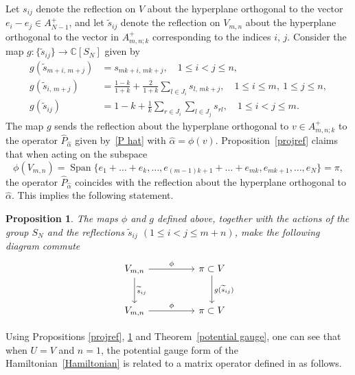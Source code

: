 \documentclass[12pt]{amsart}
\newcommand{\C}{\mathbb C}
\DeclareMathOperator{\Span}{Span}
\numberwithin{equation}{section}
\newtheorem{prop}[theorem]{Proposition}
\theoremstyle{definition}
\begin{document}
Let $s_{ij}$ denote the reflection on $V$ about the hyperplane orthogonal to the vector $e_i - e_j \in A_{N-1}^+$, and let $\widetilde{s}_{ij}$ denote the reflection on $V_{m,n}$ about the hyperplane orthogonal to the vector
in $A_{m,n; k}^+$ corresponding to the indices $i$, $j$. 
Consider the map $g \colon \{ \widetilde{s}_{ij} \} \to \C[S_N]$ given by
\begin{align*}
    g(\widetilde{s}_{m+i, \, m+j}) &= s_{mk+i, \, mk+j}, \quad 1 \leq i < j \leq n, 
    \\
    g(\widetilde{s}_{i, \, m+j}) &= \frac{1-k}{1+k} + \frac{2}{1+k} \sum\limits_{l \in J_{i}} s_{l, \, mk+j}, \quad 
    1 \leq i \leq m, \ 1 \leq j \leq n,
    \\
    g(\widetilde{s}_{ij}) &= 1-k+\frac{1}{k} \sum\limits_{r \in J_{i}} \sum\limits_{l \in J_{j}} s_{rl}, \quad 1 \leq i < j \leq m.
\end{align*}
The map $g$ sends the reflection about the hyperplane orthogonal to $v \in A_{m,n; k}^+$ to the operator  $\widehat{P}_{\widehat{\alpha}}$ given by~\eqref{P hat} with $\widehat{\alpha} = \phi(v)$.  Proposition~\ref{projref} claims that when acting on the subspace 
\begin{equation*}
    \phi(V_{m,n}) = \Span\{e_1 + \dots + e_k, \ldots, e_{(m-1)k+ 1} + \dots + e_{mk}, e_{mk+1}, \ldots, e_N\} = \pi,
\end{equation*}
the operator $\widehat{P}_{\widehat{\alpha}}$ coincides with the reflection about the hyperplane orthogonal to $\widehat{\alpha}$.  This implies the following statement.

\begin{prop}
\label{prop37}
The maps $\phi$ and $g$ defined above, together with the actions of the group $S_N$ and the reflections
$\widetilde{s}_{ij}$ $(1 \leq i < j \leq m+n)$, make the following diagram commute
\begin{equation*}
\begin{tikzcd}[row sep=large,column sep=huge]
    V_{m,n}
        \arrow[r, "\phi"]
        \arrow[d, "\widetilde{s}_{ij}"] &
    \pi \subset V
        \arrow[d, "g(\widetilde{s}_{ij})"] \\
    V_{m,n} 
        \arrow[r, "\phi"] &
   \pi \subset V
\end{tikzcd}
\end{equation*}
\end{prop}

Using Propositions \ref{projref}, \ref{prop37} and Theorem~\ref{potential gauge}, one can see that when $U=V$ and $n=1$, the potential gauge form of the Hamiltonian~\eqref{Hamiltonian} is related to a matrix operator defined in \cite{CGV} as follows.
\end{document}
